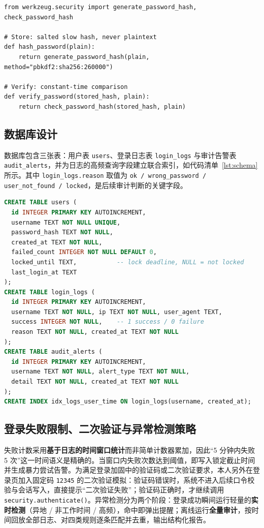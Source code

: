 \documentclass[bwprint]{report}
\begin{document}
\begin{lstlisting}[caption={口令哈希与校验（security.py 节选）}, label={lst:hash}]
from werkzeug.security import generate_password_hash, check_password_hash

# Store: salted slow hash, never plaintext
def hash_password(plain):
    return generate_password_hash(plain, method="pbkdf2:sha256:260000")

# Verify: constant-time comparison
def verify_password(stored_hash, plain):
    return check_password_hash(stored_hash, plain)
\end{lstlisting}

\subsection{数据库设计}
数据库包含三张表：用户表 \texttt{users}、登录日志表 \texttt{login\_logs} 与审计告警表 \texttt{audit\_alerts}，并为日志的高频查询字段建立联合索引，如代码清单~\ref{lst:schema} 所示。其中 \texttt{login\_logs.reason} 取值为 \texttt{ok / wrong\_password / user\_not\_found / locked}，是后续审计判断的关键字段。

\begin{lstlisting}[caption={数据库表结构（db.py 节选）}, label={lst:schema}, language=SQL]
CREATE TABLE users (
  id INTEGER PRIMARY KEY AUTOINCREMENT,
  username TEXT NOT NULL UNIQUE,
  password_hash TEXT NOT NULL,
  created_at TEXT NOT NULL,
  failed_count INTEGER NOT NULL DEFAULT 0,
  locked_until TEXT,           -- lock deadline, NULL = not locked
  last_login_at TEXT
);
CREATE TABLE login_logs (
  id INTEGER PRIMARY KEY AUTOINCREMENT,
  username TEXT NOT NULL, ip TEXT NOT NULL, user_agent TEXT,
  success INTEGER NOT NULL,    -- 1 success / 0 failure
  reason TEXT NOT NULL, created_at TEXT NOT NULL
);
CREATE TABLE audit_alerts (
  id INTEGER PRIMARY KEY AUTOINCREMENT,
  username TEXT NOT NULL, alert_type TEXT NOT NULL,
  detail TEXT NOT NULL, created_at TEXT NOT NULL
);
CREATE INDEX idx_logs_user_time ON login_logs(username, created_at);
\end{lstlisting}

\subsection{登录失败限制、二次验证与异常检测策略}
失败计数采用\textbf{基于日志的时间窗口统计}而非简单计数器累加，因此“5 分钟内失败 5 次”这一时间语义是精确的。当窗口内失败次数达到阈值，即写入锁定截止时间并生成暴力尝试告警。为满足登录加固中的验证码或二次验证要求，本人另外在登录页加入固定码 \texttt{12345} 的二次验证模拟：验证码错误时，系统不进入后续口令校验与会话写入，直接提示“二次验证失败”；验证码正确时，才继续调用 \texttt{security.authenticate()}。异常检测分为两个阶段：登录成功瞬间运行轻量的\textbf{实时检测}（异地 / 非工作时间 / 高频），命中即弹出提醒；离线运行\textbf{全量审计}，按时间回放全部日志、对四类规则逐条匹配并去重，输出结构化报告。
\end{document}
